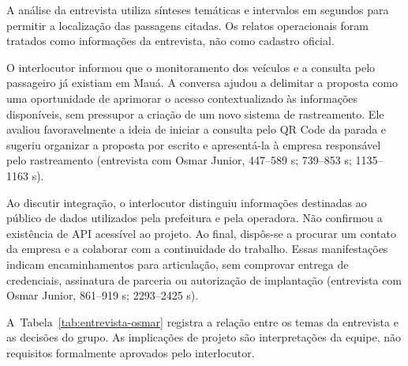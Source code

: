 \documentclass[12pt,oneside,a4paper,brazil,chapter=TITLE]{abntex2}
\begin{document}
A análise da entrevista utiliza sínteses temáticas e intervalos em segundos para permitir a localização das passagens citadas. Os relatos operacionais foram tratados como informações da entrevista, não como cadastro oficial.

O interlocutor informou que o monitoramento dos veículos e a consulta pelo passageiro já existiam em Mauá. A conversa ajudou a delimitar a proposta como uma oportunidade de aprimorar o acesso contextualizado às informações disponíveis, sem pressupor a criação de um novo sistema de rastreamento. Ele avaliou favoravelmente a ideia de iniciar a consulta pelo QR Code da parada e sugeriu organizar a proposta por escrito e apresentá-la à empresa responsável pelo rastreamento  (entrevista com Osmar Junior, 447--589 s; 739--853 s; 1135--1163 s).

Ao discutir integração, o interlocutor distinguiu informações destinadas ao público de dados utilizados pela prefeitura e pela operadora. Não confirmou a existência de API acessível ao projeto. Ao final, dispôs-se a procurar um contato da empresa e a colaborar com a continuidade do trabalho. Essas manifestações indicam encaminhamentos para articulação, sem comprovar entrega de credenciais, assinatura de parceria ou autorização de implantação  (entrevista com Osmar Junior, 861--919 s; 2293--2425 s).

\clearpage
A~Tabela~\ref{tab:entrevista-osmar} registra a relação entre os temas da entrevista e as decisões do grupo. As implicações de projeto são interpretações da equipe, não requisitos formalmente aprovados pelo interlocutor.
\end{document}

